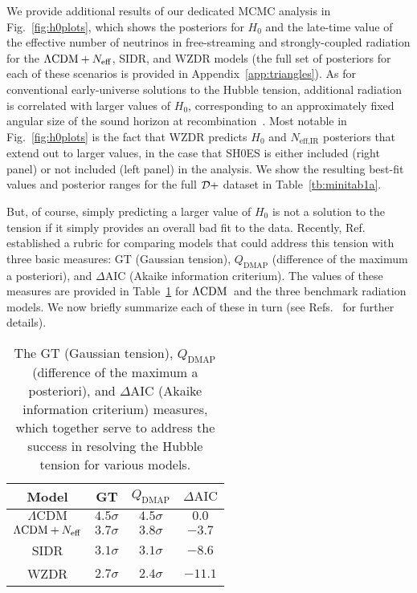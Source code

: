 \documentclass[aps,prd,twocolumn,nofootinbib,superscriptaddress]{revtex4}
\newcommand{\D}{\cal{D}}
\newcommand{\QDMAP}{Q_\text{DMAP}}
\newcommand{\Fig}[1]{Fig.~\ref{fig:#1}}
\newcommand{\App}[1]{Appendix~\ref{app:#1}}
\newcommand{\Tab}[1]{Table~\ref{tb:#1}}
\def\lcdm{$\Lambda{\rm CDM}$}
\newcommand{\Neff}{N_{\rm eff}}
\begin{document}
We provide additional results of our dedicated MCMC analysis in \Fig{h0plots}, which shows the posteriors for $H_0$ and the late-time value of the effective number of neutrinos in free-streaming and strongly-coupled radiation for the $\text{$\Lambda$CDM}+ \Neff$, SIDR, and WZDR models (the full set of posteriors for each of these scenarios is provided in \App{triangles}). As for conventional early-universe solutions to the Hubble tension, additional radiation is correlated with larger values of $H_0$, corresponding to an approximately fixed angular size of the sound horizon at recombination~\cite{Hou:2011ec}. Most notable in  \Fig{h0plots} is the fact that WZDR predicts $H_0$ and $N_\text{eff,IR}$ posteriors that extend out to larger values, in the case that SH0ES is either included (right panel) or not included (left panel) in the analysis. We show the resulting best-fit values and posterior ranges for the full $\D+$ dataset in \Tab{minitab1a}.

But, of course, simply predicting a larger value of $H_0$ is not a solution to the tension if it simply provides an overall bad fit to the data. Recently, Ref.~\cite{Schoneberg:2021qvd} established a rubric for comparing models that could address this tension with three basic measures: GT (Gaussian tension), $\QDMAP$ (difference of the maximum a posteriori), and $\Delta \text{AIC}$ (Akaike information criterium). The values of these measures are provided in \Tab{minitab2} for \lcdm \, and the three benchmark radiation models. We now briefly summarize each of these in turn (see Refs.~\cite{Schoneberg:2021qvd,Raveri:2018wln} for further details). 

\begin{table}[t]
\centering
\begin{tabular}{|c || c | c | c |} 
\hline
Model& GT & $\QDMAP$ &  $\Delta \text{AIC}$  \\
\hline \hline
$\text{$\Lambda$CDM}$ & $4.5 \sigma$ & $4.5 \sigma$ & $0.0$\\  \hline
$\text{$\Lambda$CDM} + \Neff$ & $3.7 \sigma$ & $3.8 \sigma$ & $-3.7$ \\  \hline
SIDR & $3.1 \sigma$ & $3.1 \sigma$ & $-8.6$ \\ \hline
WZDR & $2.7 \sigma$ & $2.4 \sigma$ & $-11.1$ \\
 \hline
\end{tabular}
\caption{The GT (Gaussian tension), $\QDMAP$ (difference of the maximum a posteriori), and $\Delta \text{AIC}$ (Akaike information criterium) measures, which together serve to address the success in resolving the Hubble tension for various models.}
\label{tb:minitab2}
\end{table}
\end{document}
